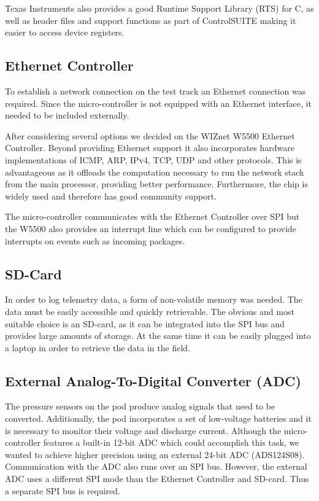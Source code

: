 Texas Instruments also provides a good Runtime Support Library (RTS) for C, as well as header files and support functions as part of ControlSUITE\cite{controlsuite} making it easier to access device registers.

\subsection{Ethernet Controller}

To establish a network connection on the test track an Ethernet connection was required. Since the micro-controller is not equipped with an Ethernet interface, it needed to be included externally.

After considering several options we decided on the WIZnet W5500 Ethernet Controller\cite{wiznet}. Beyond providing Ethernet support it also incorporates hardware implementations of ICMP, ARP, IPv4, TCP, UDP and other protocols. This is advantageous as it offloads the computation necessary to run the network stack from the main processor, providing better performance. Furthermore, the chip is widely used and therefore has good community support.

The micro-controller communicates with the Ethernet Controller over SPI but the W5500 also provides an interrupt line which can be configured to provide interrupts on events such as incoming packages.

\subsection{SD-Card}

In order to log telemetry data, a form of non-volatile memory was needed. The data must be easily accessible and quickly retrievable. The obvious and most suitable choice is an SD-card, as it can be integrated into the SPI bus and provides large amounts of storage. At the same time it can be easily plugged into a laptop in order to retrieve the data in the field.

\subsection{External Analog-To-Digital Converter (ADC)}

The pressure sensors on the pod produce analog signals that need to be converted. Additionally, the pod incorporates a set of low-voltage batteries and it is necessary to monitor their voltage and discharge current. Although the micro-controller features a built-in 12-bit ADC which could accomplish this task, we wanted to achieve higher precision using an external 24-bit ADC (ADS124S08). Communication with the ADC also runs over an SPI bus. However, the external ADC uses a different SPI mode than the Ethernet Controller and SD-card. Thus a separate SPI bus is required.

